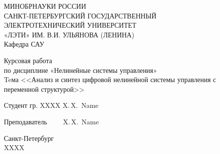 \thispagestyle{empty}
\begin{titlepage}
  \begin{center}

 	\bfseries{
	МИНОБРНАУКИ РОССИИ \\[8bp]
	САНКТ-ПЕТЕРБУРГСКИЙ ГОСУДАРСТВЕННЫЙ \\[8bp]
	ЭЛЕКТРОТЕХНИЧЕСКИЙ УНИВЕРСИТЕТ \\[8bp]
	«ЛЭТИ» ИМ. В.И. УЛЬЯНОВА (ЛЕНИНА) \\[8bp]
	Кафедра САУ
	\vspace{5cm}
	    
	 
	
	 Курсовая работа\\[8bp]
	по дисциплине «Нелинейные системы управления»\\[8bp]
	Teма <<Анализ и синтез цифровой нелинейной системы управления с переменной структурой>> 

}

\end{center}


\newlength{\ML}
\vfill 
  Студент гр. XXXX \hfill
  \underline{\hspace{\ML}} X.\,X.~Name
   
  Преподаватель\hfill
  \underline{\hspace{\ML}} ~~~~X.\,X.~Name
 
\begin{center}
  Санкт-Петербург\\[8bp]
  XXXX
  
\end{center}
\end{titlepage}

